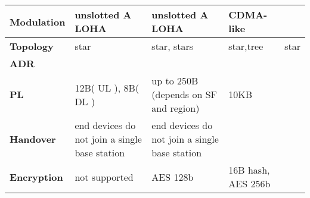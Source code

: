 \begin{table}[h!]
\begin{tabulary}{\textwidth}{L|L|L|L|L}
	\textbf{Modulation}                           & unslotted A LOHA                              & unslotted A LOHA                                              & CDMA-like                                       & \\\hline                                                                       
	\textbf{Topology}                             & star                                          & star, stars                                                   & star,tree                                       & star \\\hline                                                                  
	\textbf{\ac{ADR}}                   & \ko                                           & \ok                                                           & \ok                                             & \ko \\\hline                                                                   
	\textbf{\ac{PL}}                       & 12B( UL ), 8B( DL )                           & up to 250B (depends on SF and region)                         & 10KB                                            & \\\hline
	\textbf{Handover}                             & end devices do not join a single base station & end devices do not join a single base station                 &                                                 & \\\hline                                                                       
	\textbf{Encryption}                           & not supported                                 & AES 128b                                                      & 16B hash, AES 256b                              & \\\hline                                                                       
	\end{tabulary}
\caption{\label{tab:edesf} \cite{raza_low_22a}}
\end{table}


